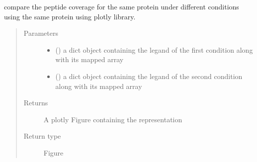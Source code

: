\documentclass[letterpaper,10pt,english]{sphinxmanual}
\begin{document}
\begin{fulllineitems}
\label{\detokenize{IPTK.Visualization:IPTK.Visualization.vizTools.plotly_paired_representation}}
compare the peptide coverage for the same protein under different conditions using the same protein using plotly library.
\begin{quote}\begin{description}
\item[{Parameters}] \leavevmode\begin{itemize}
\item {} 
 (\sphinxstyleliteralemphasis{\sphinxupquote{{[}}}\sphinxstyleliteralemphasis{\sphinxupquote{, }}\sphinxstyleliteralemphasis{\sphinxupquote{{]}}}) \textendash{} a dict object containing the legand of the first condition along with its mapped array

\item {} 
 (\sphinxstyleliteralemphasis{\sphinxupquote{{[}}}\sphinxstyleliteralemphasis{\sphinxupquote{, }}\sphinxstyleliteralemphasis{\sphinxupquote{{]}}}) \textendash{} a dict object containing the legand of the second condition along with its mapped array

\end{itemize}

\item[{Returns}] \leavevmode
A plotly Figure containing the representation

\item[{Return type}] \leavevmode
Figure

\end{description}\end{quote}

\end{fulllineitems}
\end{document}
